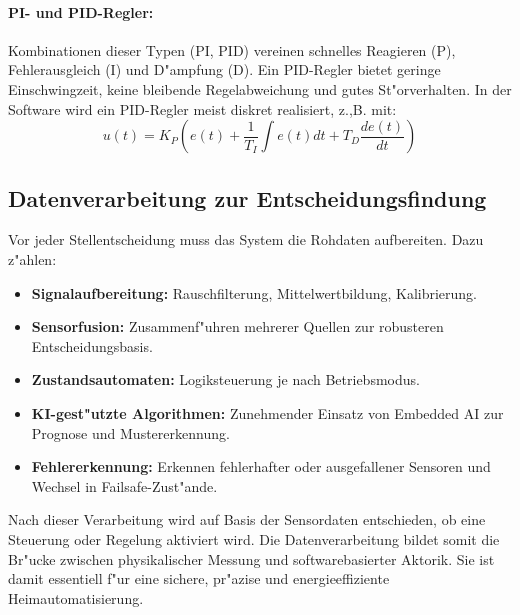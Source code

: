 \paragraph{PI- und PID-Regler:} Kombinationen dieser Typen (PI, PID) vereinen schnelles Reagieren (P), Fehlerausgleich (I) und D"ampfung (D). Ein PID-Regler bietet geringe Einschwingzeit, keine bleibende Regelabweichung und gutes St"orverhalten. In der Software wird ein PID-Regler meist diskret realisiert, z.,B. mit:
\begin{equation}
u(t) = K_P \left( e(t) + \frac{1}{T_I} \int e(t) dt + T_D \frac{de(t)}{dt} \right)
\end{equation}
\autocite{steuern_regeln_2}
\subsection*{Datenverarbeitung zur Entscheidungsfindung}
Vor jeder Stellentscheidung muss das System die Rohdaten aufbereiten. Dazu z"ahlen:
\begin{itemize}
\item \textbf{Signalaufbereitung:} Rauschfilterung, Mittelwertbildung, Kalibrierung.
\item \textbf{Sensorfusion:} Zusammenf"uhren mehrerer Quellen zur robusteren Entscheidungsbasis.
\item \textbf{Zustandsautomaten:} Logiksteuerung je nach Betriebsmodus.
\item \textbf{KI-gest"utzte Algorithmen:} Zunehmender Einsatz von Embedded AI zur Prognose und Mustererkennung.
\item \textbf{Fehlererkennung:} Erkennen fehlerhafter oder ausgefallener Sensoren und Wechsel in Failsafe-Zust"ande.
\end{itemize}

\noindent Nach dieser Verarbeitung wird auf Basis der Sensordaten entschieden, ob eine Steuerung oder Regelung aktiviert wird. Die Datenverarbeitung bildet somit die Br"ucke zwischen physikalischer Messung und softwarebasierter Aktorik. Sie ist damit essentiell f"ur eine sichere, pr"azise und energieeffiziente Heimautomatisierung.

